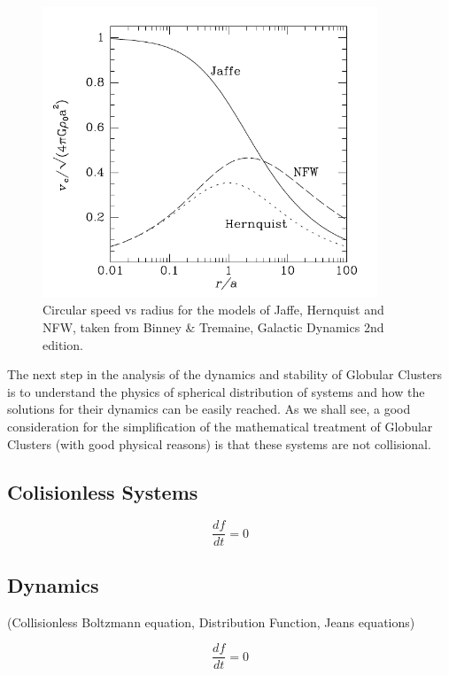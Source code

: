 \begin{figure}[H]
\centering
\includegraphics[width=10cm]{images/circular_velocity_vs_radius.png}
\caption[Circular speed vs radius for the Jaffe, Hernquist, and NFW models]{Circular speed vs radius for the models of Jaffe, Hernquist and NFW, taken from Binney \& Tremaine, Galactic Dynamics 2nd edition.}
\end{figure}

The next step in the analysis of the dynamics and stability of Globular Clusters is to understand the physics of spherical distribution of systems and how the solutions for their dynamics can be easily reached. As we shall see, a good consideration for the simplification of the mathematical treatment of Globular Clusters (with good physical reasons) is that these systems are not collisional.

\subsection{Colisionless Systems}

\begin{equation}
\dfrac{df}{dt}=0
\end{equation}

\subsection{Dynamics}

(Collisionless Boltzmann equation, Distribution Function, Jeans equations)

\begin{equation}
\frac{df}{dt}=0
\end{equation}

